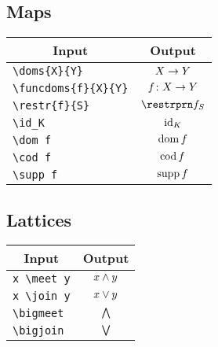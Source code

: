 \documentclass[a4paper, 11pt]{article}
\begin{document}
\subsection{Maps}
\begin{center}
  \begin{tabular}{lc} \toprule
    \multicolumn{1}{c}{Input} & Output               \\\midrule
    \verb|\doms{X}{Y}|   & ${X}\to{Y}$        \\
    \verb|\funcdoms{f}{X}{Y}|   & $f\colon{X}\to{Y}$ \\
    \verb|\restr{f}{S}|   & $\restr{f}{S}$       \\
    \verb|\id_K|   & $\operatorname{id}_K$              \\
    \verb|\dom f|   & $\operatorname{dom} f$             \\
    \verb|\cod f|   & $\operatorname{cod} f$             \\
    \verb|\supp f|   & $\operatorname{supp} f$            \\
    \bottomrule
  \end{tabular}
\end{center}

\subsection{Lattices}
\begin{center}
  \begin{tabular}{lc} \toprule
    \multicolumn{1}{c}{Input} & Output      \\\midrule
    \verb|x \meet y|   & $x \mathbin{\wedge} y$ \\
    \verb|x \join y|   & $x \mathbin{\vee} y$ \\
    \verb|\bigmeet|   & $\bigwedge$  \\
    \verb|\bigjoin|   & $\bigvee$  \\
    \bottomrule
  \end{tabular}
\end{center}
\end{document}
